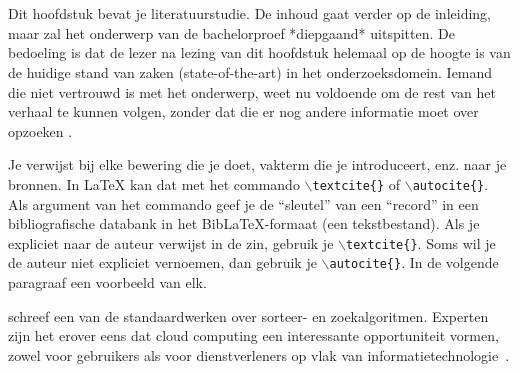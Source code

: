 \subsection{}

\subsection{}



\section{}



Dit hoofdstuk bevat je literatuurstudie. De inhoud gaat verder op de inleiding, maar zal het onderwerp van de bachelorproef *diepgaand* uitspitten. De bedoeling is dat de lezer na lezing van dit hoofdstuk helemaal op de hoogte is van de huidige stand van zaken (state-of-the-art) in het onderzoeksdomein. Iemand die niet vertrouwd is met het onderwerp, weet nu voldoende om de rest van het verhaal te kunnen volgen, zonder dat die er nog andere informatie moet over opzoeken \autocite{Pollefliet2011}.

Je verwijst bij elke bewering die je doet, vakterm die je introduceert, enz. naar je bronnen. In \LaTeX{} kan dat met het commando \texttt{$\backslash${textcite\{\}}} of \texttt{$\backslash${autocite\{\}}}. Als argument van het commando geef je de ``sleutel'' van een ``record'' in een bibliografische databank in het Bib\LaTeX{}-formaat (een tekstbestand). Als je expliciet naar de auteur verwijst in de zin, gebruik je \texttt{$\backslash${}textcite\{\}}.
Soms wil je de auteur niet expliciet vernoemen, dan gebruik je \texttt{$\backslash${}autocite\{\}}. In de volgende paragraaf een voorbeeld van elk.

\textcite{Knuth1998} schreef een van de standaardwerken over sorteer- en zoekalgoritmen. Experten zijn het erover eens dat cloud computing een interessante opportuniteit vormen, zowel voor gebruikers als voor dienstverleners op vlak van informatietechnologie~\autocite{Creeger2009}.

\lipsum[7-20]
